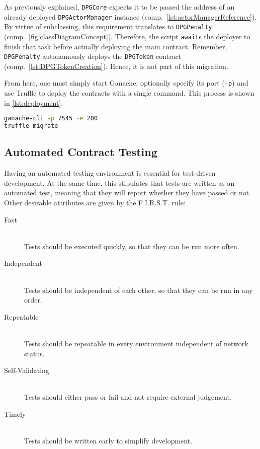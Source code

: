 As previously explained, \texttt{DPGCore} expects it to be passed the address of an already deployed \texttt{DPGActorManager} instance (comp.~\autoref{lst:actorManagerReference}). By virtue of subclassing, this requirement translates to \texttt{DPGPenalty} (comp.~\autoref{fig:classDiagramConcept}). Therefore, the script \texttt{await}s the deployer to finish that task before actually deploying the main contract. Remember, \texttt{DPGPenalty} autonomously deploys the \texttt{DPGToken} contract (comp.~\ref{lst:DPGTokenCreation}). Hence, it is not part of this migration.

From here, one must simply start Ganache, optionally specify its port (\texttt{-p}) and use Truffle to deploy the contracts with a single command. This process is shown in \autoref{lst:deployment}.

\begin{lstlisting}[language=bash, caption=Deploying to Ganache, label=lst:deployment]
ganache-cli -p 7545 -e 200
truffle migrate
\end{lstlisting}

\subsection{Automated Contract Testing}
Having an automated testing environment is essential for test-driven development. At the same time, this stipulates that tests are written as an automated test, meaning that they will report whether they have passed or not. Other desirable attributes are given by the F.I.R.S.T. rule:

\begin{description}
	\item[Fast]
  	\hfill \\
  	Tests should be executed quickly, so that they can be run more often.
  	\item[Independent]
  	\hfill \\
  	Tests should be independent of each other, so that they can be run in any order.
  	\item[Repeatable]
  	\hfill \\  
	Tests should be repeatable in every environment independent of network status. 
  	\item[Self-Validating]
  	\hfill \\  
  	Tests should either pass or fail and not require external judgement.
	\item[Timely]
  	\hfill \\  
  	Tests should be written early to simplify development.
\end{description}

